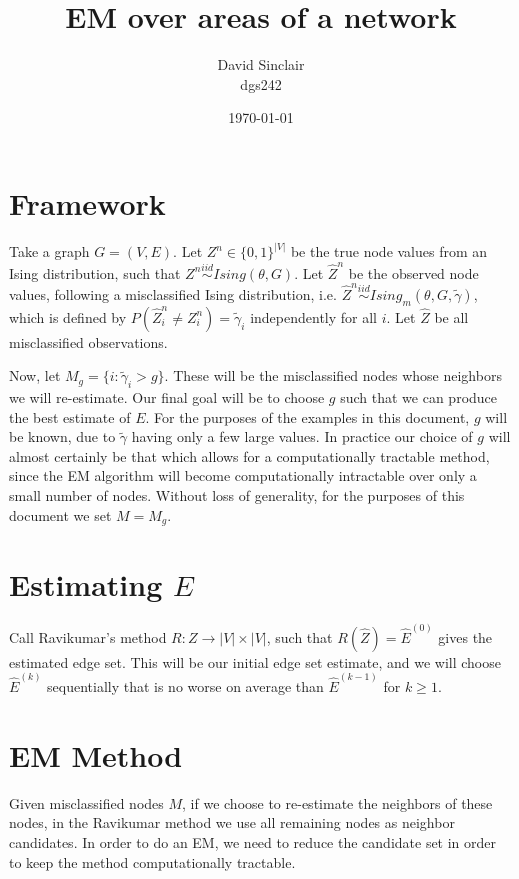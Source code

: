 \documentclass[12pt]{article}
\begin{document}
\title{EM over areas of a network}
\author{David Sinclair\\
dgs242}
\date{\today}
\maketitle

\section{Framework}
Take a graph $G = (V, E)$.  Let $Z^n \in \{0, 1\}^{|V|}$ be the true node values from an Ising distribution, such that $Z^n \stackrel{iid}{\sim} Ising(\theta, G)$.  Let $\hat{Z}^n$ be the observed node values, following a misclassified Ising distribution, i.e. $\hat{Z}^n \stackrel{iid}{\sim} Ising_m(\theta, G, \tilde\gamma)$, which is defined by $P(\hat{Z}^n_i \neq Z^n_i ) = \tilde\gamma_i$ independently for all $i$.  Let $\hat{Z}$ be all misclassified observations.

Now, let $M_g = \{i : \tilde\gamma_i > g\}$.  These will be the misclassified nodes whose neighbors we will re-estimate.  Our final goal will be to choose $g$ such that we can produce the best estimate of $E$.  For the purposes of the examples in this document, $g$ will be known, due to $\tilde\gamma$ having only a few large values.  In practice our choice of $g$ will almost certainly be that which allows for a computationally tractable method, since the EM algorithm will become computationally intractable over only a small number of nodes.  Without loss of generality, for the purposes of this document we set $M = M_g$.

\section{Estimating $E$}
Call Ravikumar's method $R: Z \rightarrow |V| \times |V|$, such that $R(\hat{Z}) = \hat{E}^{(0)}$ gives the estimated edge set. This will be our initial edge set estimate, and we will choose $\hat{E}^{(k)}$ sequentially that is no worse on average than $\hat{E}^{(k-1)}$ for $k \geq 1$.

\section{EM Method}
Given misclassified nodes $M$, if we choose to re-estimate the neighbors of these nodes, in the Ravikumar method we use all remaining nodes as neighbor candidates.  In order to do an EM, we need to reduce the candidate set in order to keep the method computationally tractable.  
\end{document}
